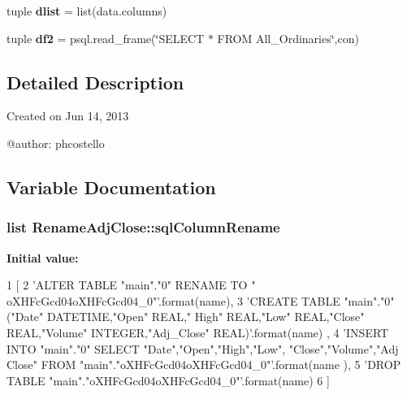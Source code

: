 \begin{DoxyCompactItemize}
\item 
\hypertarget{namespaceRenameAdjClose_ae4d1dad3c44f47ba938c6efcb6258775}{tuple {\bfseries dlist} = list(data.\-columns)}\label{namespaceRenameAdjClose_ae4d1dad3c44f47ba938c6efcb6258775}

\item 
\hypertarget{namespaceRenameAdjClose_a539ca6dc5884fc055bab670266ee3d86}{tuple {\bfseries df2} = psql.\-read\-\_\-frame(\char`\"{}\-S\-E\-L\-E\-C\-T $\ast$ \-F\-R\-O\-M \-All\-\_\-\-Ordinaries\char`\"{},con)}\label{namespaceRenameAdjClose_a539ca6dc5884fc055bab670266ee3d86}

\end{DoxyCompactItemize}


\subsection{\-Detailed \-Description}
\begin{DoxyVerb}
Created on Jun 14, 2013

@author: phcostello
\end{DoxyVerb}
 

\subsection{\-Variable \-Documentation}
\hypertarget{namespaceRenameAdjClose_a0e33cd64fe2bbebc3ebe3501fe08bc1d}{
\subsubsection[{sql\-Column\-Rename}]{\setlength{\rightskip}{0pt plus 5cm}list \-Rename\-Adj\-Close\-::sql\-Column\-Rename}}\label{namespaceRenameAdjClose_a0e33cd64fe2bbebc3ebe3501fe08bc1d}
{\bfseries \-Initial value\-:}
\begin{DoxyCode}
1 [
2                    'ALTER TABLE "main"."{0}" RENAME TO "
      oXHFcGcd04oXHFcGcd04_{0}"'.format(name),
3                    'CREATE TABLE "main"."{0}" ("Date" DATETIME,"Open" REAL,"
      High" REAL,"Low" REAL,"Close" REAL,"Volume" INTEGER,"Adj_Close" REAL)'.format(name)
      , 
4                    'INSERT INTO "main"."{0}" SELECT "Date","Open","High","Low",
      "Close","Volume","Adj Close" FROM "main"."oXHFcGcd04oXHFcGcd04_{0}"'.format(name
      ),
5                    'DROP TABLE "main"."oXHFcGcd04oXHFcGcd04_{0}"'.format(name)
6                    ]
\end{DoxyCode}
